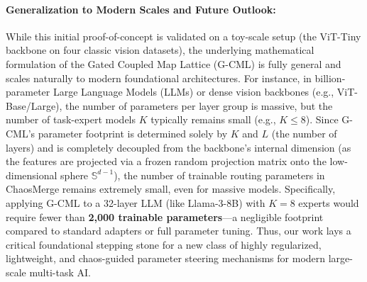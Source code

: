 \paragraph{Generalization to Modern Scales and Future Outlook:}
While this initial proof-of-concept is validated on a toy-scale setup (the ViT-Tiny backbone on four classic vision datasets), the underlying mathematical formulation of the Gated Coupled Map Lattice (G-CML) is fully general and scales naturally to modern foundational architectures.
For instance, in billion-parameter Large Language Models (LLMs) or dense vision backbones (e.g., ViT-Base/Large), the number of parameters per layer group is massive, but the number of task-expert models $K$ typically remains small (e.g., $K \le 8$). 
Since G-CML's parameter footprint is determined solely by $K$ and $L$ (the number of layers) and is completely decoupled from the backbone's internal dimension (as the features are projected via a frozen random projection matrix onto the low-dimensional sphere $\mathbb{S}^{d-1}$), the number of trainable routing parameters in ChaosMerge remains extremely small, even for massive models. 
Specifically, applying G-CML to a 32-layer LLM (like Llama-3-8B) with $K=8$ experts would require fewer than \textbf{2,000 trainable parameters}—a negligible footprint compared to standard adapters or full parameter tuning. 
Thus, our work lays a critical foundational stepping stone for a new class of highly regularized, lightweight, and chaos-guided parameter steering mechanisms for modern large-scale multi-task AI.
